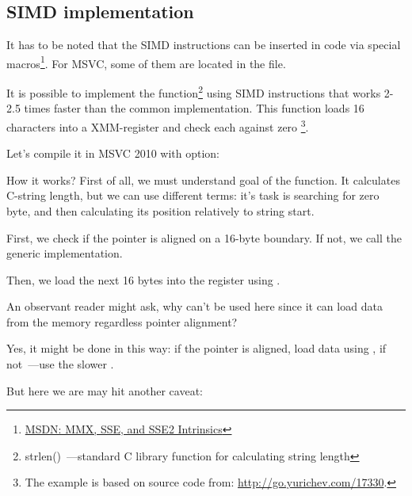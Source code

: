 ﻿\subsection{SIMD \strlen implementation}
\label{SIMD_strlen}

\newcommand{\URLMSDNSSE}{\href{http://go.yurichev.com/17262}{MSDN: MMX, SSE, and SSE2 Intrinsics}}

It has to be noted that the \ac{SIMD} instructions can be inserted in \CCpp code via special macros\footnote{\URLMSDNSSE}.
For MSVC, some of them are located in the  file.

\newcommand{\URLSTRLEN}{http://go.yurichev.com/17330}


It is possible to implement the \strlen function\footnote{strlen()~---standard C library function for calculating
string length} using SIMD instructions that works 2-2.5 times faster than the common implementation.
This function loads 16 characters into a XMM-register and check each against zero
\footnote{
The example is based on source code from: \url{\URLSTRLEN}.}.



Let's compile it in MSVC 2010 with \Ox option:



How it works?
First of all, we must understand goal of the function.
It calculates C-string length, but we can use different terms: it's task is searching for zero byte, and then calculating its position relatively to string start.

First, we check if the  pointer is aligned on a 16-byte boundary.
If not, we call the generic \strlen implementation.

Then, we load the next 16 bytes into the  register using \MOVDQA.

An observant reader might ask, why can't \MOVDQU be used here since it can load data from the memory
regardless pointer alignment?

Yes, it might be done in this way: if the pointer is aligned, load data using \MOVDQA,
if not~---use the slower \MOVDQU.

But here we are may hit another caveat:

\newcommand{\URLPAGE}{\href{http://go.yurichev.com/17136}{wikipedia}}

